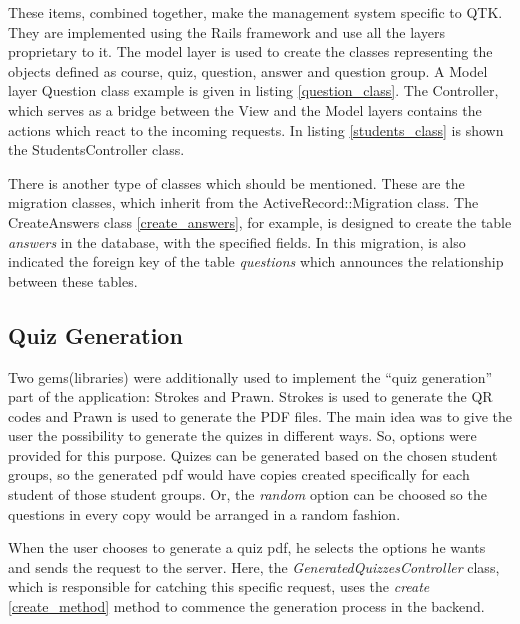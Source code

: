 These items, combined together, make the management system specific to QTK. They are implemented using the Rails framework and use all the layers proprietary to it. The model layer is used to create the classes representing the objects defined as course, quiz, question, answer and question group. A Model layer Question class example is given in listing \ref{question_class}.
The Controller, which serves as a bridge between the View and the Model layers contains the actions which react to the incoming requests. In listing \ref{students_class} is shown the StudentsController class. 

There is another type of classes which should be mentioned. These are the migration classes, which inherit from the ActiveRecord::Migration class. The CreateAnswers class \ref{create_answers}, for example, is designed to create the table \textit{answers} in the database, with the specified fields. In this migration, is also indicated the foreign key of the table \textit{questions} which announces the relationship between these tables.








\subsection{Quiz Generation}
Two gems(libraries) were additionally used to implement the ``quiz generation'' part of the application: Strokes and Prawn. Strokes is used to generate the QR codes and Prawn is used to generate the PDF files. The main idea was to give the user the possibility to generate the quizes in different ways. So, options were provided for this purpose. Quizes can be generated based on the chosen student groups, so the generated pdf would have copies created specifically for each student of those student groups. Or, the \textit{random} option can be choosed so the questions in every copy would be arranged in a random fashion.

When the user chooses to generate a quiz pdf, he selects the options he wants and sends the request to the server. Here, the \textit{GeneratedQuizzesController} class, which is responsible for catching this specific request, uses the \textit{create} \ref{create_method} method to commence the generation process in the backend. 

